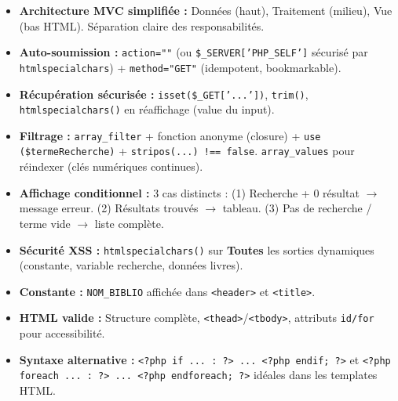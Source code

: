 \documentclass[11pt]{article}
\begin{document}
\begin{corrige}
\begin{aretenir}
\begin{itemize}
    \item \textbf{Architecture MVC simplifiée :} Données (haut), Traitement (milieu), Vue (bas HTML). Séparation claire des responsabilités.
    \item \textbf{Auto-soumission :} \texttt{action=""} (ou \texttt{\$\_SERVER['PHP\_SELF']} sécurisé par \texttt{htmlspecialchars}) + \texttt{method="GET"} (idempotent, bookmarkable).
    \item \textbf{Récupération sécurisée :} \texttt{isset(\$\_GET['...'])}, \texttt{trim()}, \texttt{htmlspecialchars()} en réaffichage (value du input).
    \item \textbf{Filtrage :} \texttt{array\_filter} + fonction anonyme (closure) + \texttt{use (\$termeRecherche)} + \texttt{stripos(...) !== false}. \texttt{array\_values} pour réindexer (clés numériques continues).
    \item \textbf{Affichage conditionnel :} 3 cas distincts : (1) Recherche + 0 résultat $\rightarrow$ message erreur. (2) Résultats trouvés $\rightarrow$ tableau. (3) Pas de recherche / terme vide $\rightarrow$ liste complète.
    \item \textbf{Sécurité XSS :} \texttt{htmlspecialchars()} sur \textbf{Toutes} les sorties dynamiques (constante, variable recherche, données livres).
    \item \textbf{Constante :} \texttt{NOM\_BIBLIO} affichée dans \texttt{<header>} et \texttt{<title>}.
    \item \textbf{HTML valide :} Structure complète, \texttt{<thead>}/\texttt{<tbody>}, attributs \texttt{id/for} pour accessibilité.
    \item \textbf{Syntaxe alternative :} \texttt{<?php if ... : ?> ... <?php endif; ?>} et \texttt{<?php foreach ... : ?> ... <?php endforeach; ?>} idéales dans les templates HTML.
\end{itemize}
\end{aretenir}
\end{corrige}
\end{document}
